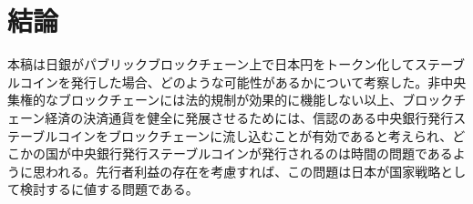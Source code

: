 \documentclass[dvipdfmx,a4paper]{jsarticle}
\begin{document}
\section{結論}

本稿は日銀がパブリックブロックチェーン上で日本円をトークン化してステーブルコインを発行した場合、どのような可能性があるかについて考察した。非中央集権的なブロックチェーンには法的規制が効果的に機能しない以上、ブロックチェーン経済の決済通貨を健全に発展させるためには、信認のある中央銀行発行ステーブルコインをブロックチェーンに流し込むことが有効であると考えられ、どこかの国が中央銀行発行ステーブルコインが発行されるのは時間の問題であるように思われる。先行者利益の存在を考慮すれば、この問題は日本が国家戦略として検討するに値する問題である。



\end{document}

